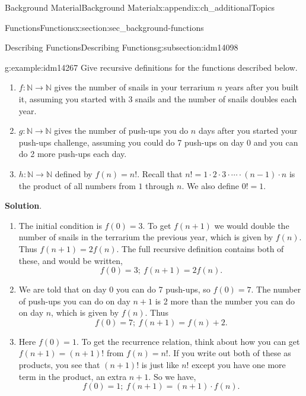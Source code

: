 \documentclass[oneside,10pt,]{book}
\numberwithin{equation}{chapter}
\def\N{\mathbb N}
\begin{document}
\begin{appendixptx}{Background Material}{}{Background Material}{}{}{x:appendix:ch_additionalTopics}
\begin{sectionptx}{Functions}{}{Functions}{}{}{x:section:sec_background-functions}
\begin{subsectionptx}{Describing Functions}{}{Describing Functions}{}{}{g:subsection:idm14098}
\begin{example}{}{g:example:idm14267}
Give recursive definitions for the functions described below.%
\begin{enumerate}
\item{}\(f:\N \to \N\) gives the number of snails in your terrarium \(n\) years after you built it, assuming you started with 3 snails and the number of snails doubles each year.%
\item{}\(g:\N \to \N\) gives the number of push-ups you do \(n\) days after you started your push-ups challenge, assuming you could do 7 push-ups on day 0 and you can do 2 more push-ups each day.%
\item{}\(h:\N \to \N\) defined by \(f(n) = n!\).  Recall that \(n! = 1 \cdot 2 \cdot 3 \cdot \cdots \cdot (n-1)\cdot n\) is the product of all numbers from \(1\) through \(n\).  We also define \(0! = 1\).%
\end{enumerate}
%
\par\smallskip%
\noindent\textbf{Solution}.\hypertarget{g:solution:idm14287}{}\quad{}%
\begin{enumerate}
\item{}The initial condition is \(f(0) = 3\).  To get \(f(n+1)\) we would double the number of snails in the terrarium the previous year, which is given by \(f(n)\).  Thus \(f(n+1) = 2f(n)\).  The full recursive definition contains both of these, and would be written,%
\begin{equation*}
f(0) = 3;~ f(n+1) = 2f(n).
\end{equation*}
%
\item{}We are told that on day 0 you can do 7 push-ups, so \(f(0) = 7\).  The number of push-ups you can do on day \(n+1\) is 2 more than the number you can do on day \(n\), which is given by \(f(n)\).  Thus%
\begin{equation*}
f(0) = 7;~ f(n+1) = f(n) + 2.
\end{equation*}
%
\item{}Here \(f(0) = 1\).  To get the recurrence relation, think about how you can get \(f(n+1) = (n+1)!\) from \(f(n) = n!\).  If you write out both of these as products, you see that \((n+1)!\) is just like \(n!\) except you have one more term in the product, an extra \(n+1\).  So we have,%
\begin{equation*}
f(0) = 1;~ f(n+1) = (n+1)\cdot f(n).
\end{equation*}
%
\end{enumerate}
%
\end{example}
\end{subsectionptx}
%
%
\typeout{************************************************}

\end{sectionptx}
\end{appendixptx}
\end{document}
